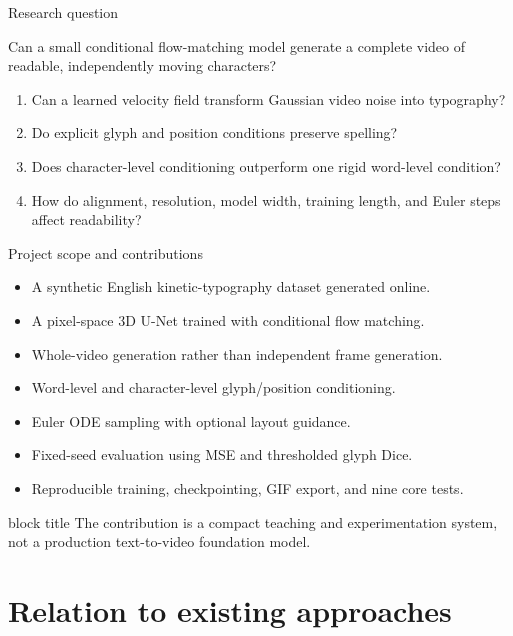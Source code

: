 \documentclass[aspectratio=169,xcolor=svgnames]{beamer}
\newcommand{\keypoint}[1]{%
\begin{center}
\begin{beamercolorbox}[rounded=true,shadow=true,wd=0.88\textwidth,sep=0.6em,center]{block title}
#1
\end{beamercolorbox}
\end{center}
}
\begin{document}
\begin{frame}{Research question}
\begin{center}
\Large
Can a small conditional flow-matching model generate a complete video of readable, independently moving characters?
\end{center}

\vspace{0.3cm}
\begin{enumerate}
    \item Can a learned velocity field transform Gaussian video noise into typography?
    \item Do explicit glyph and position conditions preserve spelling?
    \item Does character-level conditioning outperform one rigid word-level condition?
    \item How do alignment, resolution, model width, training length, and Euler steps affect readability?
\end{enumerate}
\end{frame}

\begin{frame}{Project scope and contributions}
\begin{itemize}
    \item A synthetic English kinetic-typography dataset generated online.
    \item A pixel-space 3D U-Net trained with conditional flow matching.
    \item Whole-video generation rather than independent frame generation.
    \item Word-level and character-level glyph/position conditioning.
    \item Euler ODE sampling with optional layout guidance.
    \item Fixed-seed evaluation using MSE and thresholded glyph Dice.
    \item Reproducible training, checkpointing, GIF export, and nine core tests.
\end{itemize}

\keypoint{The contribution is a compact teaching and experimentation system, not a production text-to-video foundation model.}
\end{frame}

\section{Relation to existing approaches}
\end{document}
